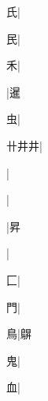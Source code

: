 \begin{multicols}{2}
{{\cjk{}{\cnsym{}　}{\cnsym{}　}氏}|{}\par
{\cjk{}{\cnsym{}　}{\cnsym{}　}民}|{}\par
{\cjk{}{\cnsym{}　}{\cnsym{}　}禾}|{}\par
{\cjk{}{\cnsym{}　}{\cnsym{}　}{\cnsym{}　}}|{\cjk{}暹}\par
{\cjk{}{\cnsym{}　}{\cnsym{}　}虫}|{}\par
{\cjk{}卄井井}|{}\par
{\cjk{}{\cnsym{}　}{\cnsym{}　}{\cnsym{}　}}|{}\par
{\cjk{}{\cnsym{}　}{\cnsym{}　}{\cnsym{}　}}|{}\par
{\cjk{}{\cnsym{}　}{\cnsym{}　}{\cnsym{}　}}|{\cjk{}昇}\par
{\cjk{}{\cnsym{}　}{\cnsym{}　}{\cnsym{}　}}|{}\par
{匚}|{}\par
{\cjk{}{\cnsym{}　}{\cnsym{}　}門}|{}\par
{\cjk{}{\cnsym{}　}{\cnsym{}　}鳥}|{\cjk{}鵿}\par
{\cjk{}{\cnsym{}　}{\cnsym{}　}鬼}|{}\par
{\cjk{}{\cnsym{}　}{\cnsym{}　}血}|{}\par
}
\end{multicols}
